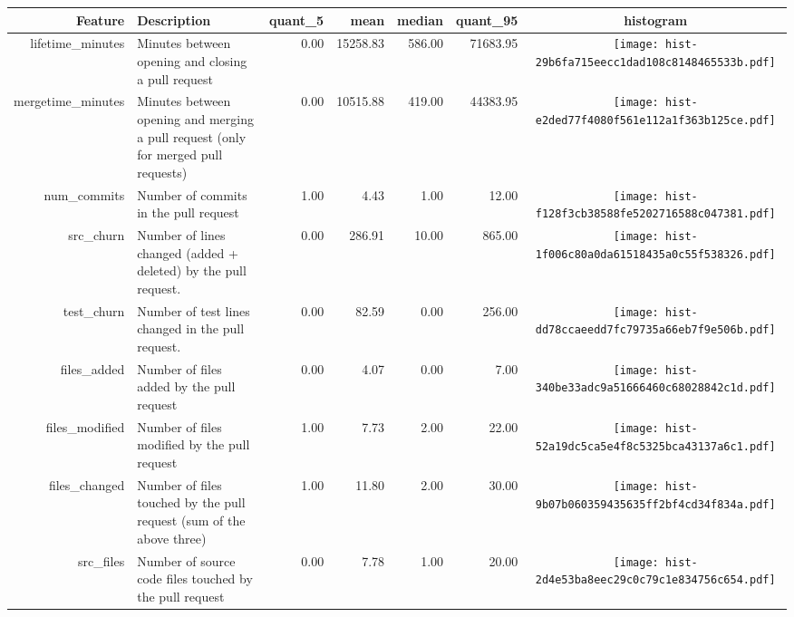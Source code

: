 \begin{table*}[ht]
\centering
\begin{tabular}{rp{16em}rrrrc}
  \hline
Feature & Description & quant\_5 & mean & median & quant\_95 & histogram \\ 
  \hline
lifetime\_minutes & Minutes between opening and closing a pull request & 0.00 & 15258.83 & 586.00 & 71683.95 & \texttt{[image: hist-29b6fa715eecc1dad108c8148465533b.pdf]} \\ 
  mergetime\_minutes & Minutes between opening and merging a pull request (only for merged pull
    requests) & 0.00 & 10515.88 & 419.00 & 44383.95 & \texttt{[image: hist-e2ded77f4080f561e112a1f363b125ce.pdf]} \\ 
  num\_commits & Number of commits in the pull request & 1.00 & 4.43 & 1.00 & 12.00 & \texttt{[image: hist-f128f3cb38588fe5202716588c047381.pdf]} \\ 
  src\_churn & Number of lines changed (added + deleted) by the pull request. & 0.00 & 286.91 & 10.00 & 865.00 & \texttt{[image: hist-1f006c80a0da61518435a0c55f538326.pdf]} \\ 
  test\_churn & Number of test lines changed in the pull request. & 0.00 & 82.59 & 0.00 & 256.00 & \texttt{[image: hist-dd78ccaeedd7fc79735a66eb7f9e506b.pdf]} \\ 
  files\_added & Number of files added by the pull request & 0.00 & 4.07 & 0.00 & 7.00 & \texttt{[image: hist-340be33adc9a51666460c68028842c1d.pdf]} \\ 
  files\_modified & Number of files modified by the pull request & 1.00 & 7.73 & 2.00 & 22.00 & \texttt{[image: hist-52a19dc5ca5e4f8c5325bca43137a6c1.pdf]} \\ 
  files\_changed & Number of files touched by the pull request (sum of the above three) & 1.00 & 11.80 & 2.00 & 30.00 & \texttt{[image: hist-9b07b060359435635ff2bf4cd34f834a.pdf]} \\ 
  src\_files & Number of source code files touched by the pull request & 0.00 & 7.78 & 1.00 & 20.00 & \texttt{[image: hist-2d4e53ba8eec29c0c79c1e834756c654.pdf]} \\ 

\end{tabular}
\end{table*}
